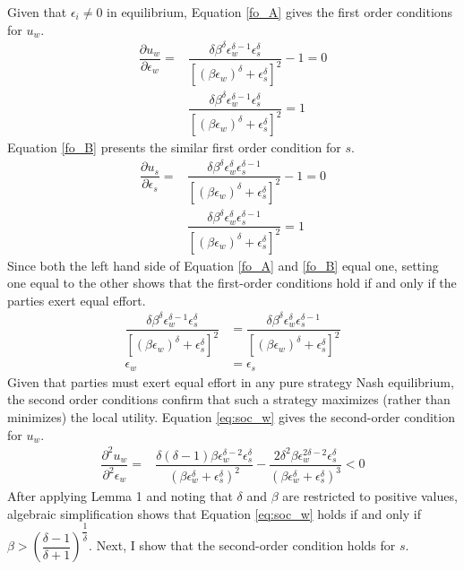 \documentclass[12pt]{article}
\begin{document}
\begin{appendix}
Given that $\epsilon_i \neq 0$ in equilibrium, Equation \ref{fo_A} gives the first order conditions for $u_w$.
\begin{align}
\dfrac{\partial u_w}{\partial \epsilon_w} = &\dfrac{\delta \beta^\delta \epsilon_w^{\delta-1} \epsilon_s^\delta}{[(\beta\epsilon_w)^\delta + \epsilon_s^\delta]^2} -1 = 0 \nonumber\\
&\dfrac{\delta \beta^\delta \epsilon_w^{\delta-1} \epsilon_s^\delta}{[(\beta\epsilon_w)^\delta + \epsilon_s^\delta]^2} = 1\label{fo_A}
\end{align}
Equation \ref{fo_B} presents the similar first order condition for $s$.
\begin{align}
\dfrac{\partial u_s}{\partial \epsilon_s} = &\dfrac{\delta \beta^\delta \epsilon_w^{\delta} \epsilon_s^{\delta - 1}}{[(\beta\epsilon_w)^\delta + \epsilon_s^\delta]^2} -1 = 0 \nonumber\\
&\dfrac{\delta \beta^\delta \epsilon_w^{\delta} \epsilon_s^{\delta - 1}}{[(\beta\epsilon_w)^\delta + \epsilon_s^\delta]^2} = 1\label{fo_B}
\end{align}
Since both the left hand side of Equation \ref{fo_A} and \ref{fo_B} equal one, setting one equal to the other shows that the first-order conditions hold if and only if the parties exert equal effort.
\begin{align}
\dfrac{\delta \beta^\delta \epsilon_w^{\delta-1} \epsilon_s^\delta}{[(\beta\epsilon_w)^{\delta} + \epsilon_s^\delta]^2} &= 
\dfrac{\delta \beta^\delta \epsilon_w^{\delta} \epsilon_s^{\delta - 1}}{[(\beta\epsilon_w)^\delta + \epsilon_s^\delta]^2}\nonumber\\
\epsilon_w &= \epsilon_s\nonumber
\end{align}
Given that parties must exert equal effort in any pure strategy Nash equilibrium, the second order conditions  confirm that such a strategy maximizes (rather than minimizes) the local utility. Equation \ref{eq:soc_w} gives the second-order condition for $u_w$.
\begin{align}
\label{eq:soc_w} \dfrac{\partial ^2u_w}{\partial ^2\epsilon_w} = &\dfrac{\delta (\delta - 1) \beta \epsilon_w^{\delta-2} \epsilon_s^{\delta}}{(\beta\epsilon_w^\delta + \epsilon_s^\delta)^2} -\dfrac{2\delta^2 \beta \epsilon_w^{2\delta - 2} \epsilon_s^{\delta}}{(\beta\epsilon_w^\delta + \epsilon_s^\delta)^3} < 0
 \end{align}
After applying Lemma 1 and noting that $\delta$ and $\beta$ are restricted to positive values, algebraic simplification shows that Equation \ref{eq:soc_w} holds if and only if $\beta > \left (\dfrac{\delta - 1}{\delta + 1} \right ) ^{\dfrac{1}{\delta}}$. Next, I show that the second-order condition holds for $s$.

\end{appendix}
\end{document}
